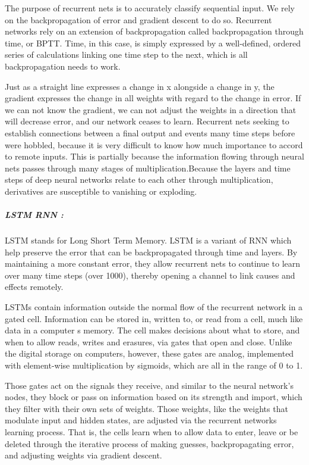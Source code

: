 The purpose of recurrent nets is to accurately classify sequential input. We rely on the backpropagation of error and gradient descent to do so. Recurrent networks rely on an extension of backpropagation called backpropagation through time, or BPTT. Time, in this case, is simply expressed by a well-defined, ordered series of calculations linking one time step to the next, which is all backpropagation needs to work.

Just as a straight line expresses a change in x alongside a change in y, the gradient expresses the change in all weights with regard to the change in error. If we can not know the gradient, we can not adjust the weights in a direction that will decrease error, and our network ceases to learn. Recurrent nets seeking to establish connections between a final output and events many time steps before were hobbled, because it is very difficult to know how much importance to accord to remote inputs. This is partially because the information flowing through neural nets passes through many stages of multiplication.Because the layers and time steps of deep neural networks relate to each other through multiplication, derivatives are susceptible to vanishing or exploding.

\subparagraph{LSTM RNN :} LSTM stands for Long Short Term Memory. LSTM is a variant of RNN which help preserve the error that can be backpropagated through time and layers. By maintaining a more constant error, they allow recurrent nets to continue to learn over many time steps (over 1000), thereby opening a channel to link causes and effects remotely.

LSTMs contain information outside the normal flow of the recurrent network in a gated cell. Information can be stored in, written to, or read from a cell, much like data in a computer \textquotesingle s memory. The cell makes decisions about what to store, and when to allow reads, writes and erasures, via gates that open and close. Unlike the digital storage on computers, however, these gates are analog, implemented with element-wise multiplication by sigmoids, which are all in the range of 0 to 1.

Those gates act on the signals they receive, and similar to the neural network’s nodes, they block or pass on information based on its strength and import, which they filter with their own sets of weights. Those weights, like the weights that modulate input and hidden states, are adjusted via the recurrent networks learning process. That is, the cells learn when to allow data to enter, leave or be deleted through the iterative process of making guesses, backpropagating error, and adjusting weights via gradient descent.

